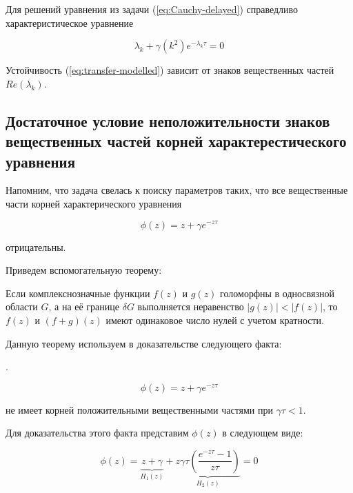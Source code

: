 Для решений уравнения из задачи (\ref{eq:Cauchy-delayed}) справедливо характеристическое уравнение

\begin{equation}
\lambda_k + \gamma(k^2) e^{-\lambda_k \tau} = 0
\end{equation}

Устойчивость (\ref{eq:transfer-modelled}) зависит от знаков вещественных частей $Re(\lambda_k)$.

\subsection{Достаточное условие неположительности знаков\\вещественных частей корней характерестического\\уравнения}

Напомним, что задача свелась к поиску параметров таких, что все вещественные части корней характерического уравнения

\begin{equation}
\phi(z) = z + \gamma e^{-z \tau}
\end{equation}

отрицательны.

Приведем вспомогательную теорему:

 Если комплекснозначные функции $f(z)$ и $g(z)$ голоморфны в односвязной области $G$, а на её границе $\delta G$ выполняется неравенство $|g(z)| < |f(z)|$, то $f(z)$ и $(f+g)(z)$ имеют одинаковое число нулей с учетом кратности.

Данную теорему используем в доказательстве следующего факта:

.

\begin{equation*}
\phi(z) = z + \gamma e^{-z \tau}
\end{equation*}

не имеет корней положительными вещественными частями при $\gamma \tau < 1$.

Для доказательства этого факта представим $\phi (z)$ в следующем виде:

\begin{equation}
\phi(z) = \underbrace{{z + \gamma}}_{H_1(z)} + \underbrace{z \gamma \tau \left(\dfrac{e^{-z \tau} - 1}{z \tau} \right)}_{H_2(z)} = 0
\end{equation}

